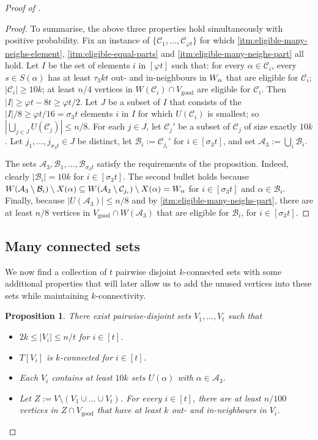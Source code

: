 \documentclass[english]{article}
\theoremstyle{plain}
\newtheorem{proposition}[theorem]{Proposition}
\theoremstyle{remark}
\def\C{\mathcal{C}}
\def\B{\mathcal{B}}
\let\phi\varphi
\def \Vg {V_{\good}}
\newcommand{\A}{\mathcal{A}}
\DeclareMathOperator{\good}{good}
\begin{document}
\begin{proof}[Proof of ]
\begin{proof}
			To summarise, the above three properties hold simultaneously with positive probability. Fix an instance of $\{\C_1, \ldots, \C_{\phi t}\}$ for which \ref{itm:eligible-many-neighs-element}, \ref{itm:eligible-equal-parts} and \ref{itm:eligible-many-neighs-part} all hold. 
			Let $I$ be the set of elements $i$ in $[\phi t]$ such that: for every $\alpha \in \C_i$, every $s \in S(\alpha)$ has at least $\tau_3 kt$ out- and in-neighbours in $W_{\alpha}$ that are eligible for $\C_i$; $|\C_i| \ge 10k$; at least $n/4$ vertices in $W(\C_i) \cap \Vg$ are eligible for $\C_i$. Then $|I| \ge \phi t - 8t \ge \phi t / 2$. Let $J$ be a subset of $I$ that consists of the $|I|/8 \ge \phi t / 16 = \sigma_3 t$ elements $i$ in $I$ for which $U(\C_i)$ is smallest; so $|\bigcup_{j \in J} U(\C_j)| \le n/8$. For each $j \in J$, let $\C_j'$ be a subset of $\C_j$ of size exactly $10k$. Let $j_1, \ldots, j_{\sigma_3 t} \in J$ be distinct, let $\B_i := \C_{j_i}'$ for $i \in [\sigma_3 t]$, and set $\A_3 := \bigcup_i \B_i$.  

			The sets $\A_3, \B_1, \ldots, \B_{\sigma_3 t}$ satisfy the requirements of the proposition. 
			Indeed, clearly $|\B_i| = 10k$ for $i \in [\sigma_3 t]$. The second bullet holds because $W(\A_3 \setminus \B_i) \setminus X(\alpha) \subseteq W(\A_2 \setminus \C_{j_i}) \setminus X(\alpha) = \Wa$ for $i \in [\sigma_3 t]$ and $\alpha \in \B_i$.
			Finally, because $|U(\A_3)| \le n/8$ and by \ref{itm:eligible-many-neighs-part}, there are at least $n/8$ vertices in $\Vg \cap W(\A_3 )$ that are eligible for $\B_i$, for $i \in [\sigma_3 t]$.
		\end{proof}




	\subsection{Many connected sets} \label{subsec:connected}

		We now find a collection of $t$ pairwise disjoint $k$-connected sets with some additional properties that will later allow us to add the unused vertices into these sets while maintaining $k$-connectivity.

		\begin{proposition} \label{prop:connected-parts}
			There exist pairwise-disjoint sets $V_1, \ldots, V_{t}$ such that 
			\begin{itemize}
				\item
					$2k \le |V_i| \le n/t$ for $i \in [t]$.
				\item
					$T[V_i]$ is $k$-connected for $i \in [t]$.
				\item
					Each $V_i$ contains at least $10k$ sets $U(\alpha)$ with $\alpha \in \A_3$.
				\item
					Let $Z := V \setminus (V_1 \cup \ldots \cup V_{t})$. For every $i \in [t]$, there are at least $n/100$ vertices in $Z \cap \Vg$ that have at least $k$ out- and in-neighbours in $V_i$.
			\end{itemize}
		\end{proposition}


\end{proof}
\end{document}
